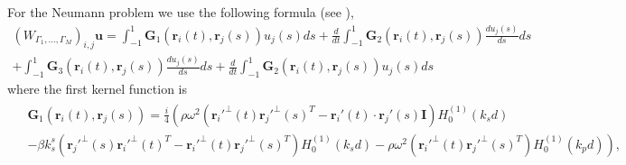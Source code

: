 \documentclass{article}
\newcommand{\bu}{\bm{u}}
\newcommand{\br}{\bm{r}}
\begin{document}
For the Neumann problem we use the following formula (see \cite{tao2021}),
\begin{align}
\label{eq:wstokeexp}
(W_{\Gamma_1,\hdots,\Gamma_M})_{i,j} \bu =  
\int_{-1}^1 \mathbf{G}_1(\br_i(t),\br_j(s))u_j(s) ds+
 \frac{d}{dt} \int_{-1}^1 \mathbf{G}_2(\br_i(t),\br_j(s)) \frac{d u_j(s)}{ds}ds\\+
\int_{-1}^{1} \mathbf{G}_3(\br_i(t),\br_j(s)) \frac{d u_j(s)}{ds}ds+ 
\frac{d}{dt} \int_{-1}^1 \mathbf{G}_2(\br_i(t),\br_j(s)) u_j(s)ds
\end{align}
where the first kernel function is 
\begin{align*}
\begin{split}
&\mathbf{G}_1(\br_i(t),\br_j(s)) = \frac{i}{4}\left( \rho \omega^2(\br_i'^\perp(t)\br_j'^\perp(s)^T-\br_i'(t) \cdot \br_j'(s) \mathbf{I}) H^{(1)}_0(k_s d) \right. \\ 
&\left.-\beta k_s^s(
\br_j'^\perp(s)\br_i'^\perp(t)^T 
-\br_i'^\perp(t)\br_j'^\perp(s)^T)H_0^{(1)}(k_sd) - \rho\omega^2 (\br_i'^\perp(t)\br_j'^\perp(s)^T)H_0^{(1)}(k_p d)\right),
\end{split}
\end{align*}
\end{document}
